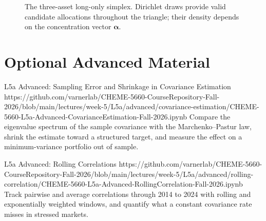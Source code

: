 \documentclass[11pt]{article}
\begin{document}
\begin{figure}[ht]
  \centering
  \caption{The three-asset long-only simplex. Dirichlet draws provide valid candidate allocations throughout the triangle; their density depends on the concentration vector $\boldsymbol\alpha$.}
  \label{fig:simplex}
\end{figure}

\newpage
\section*{Optional Advanced Material}

\notebooklink
  {L5a Advanced: Sampling Error and Shrinkage in Covariance Estimation}
  {https://github.com/varnerlab/CHEME-5660-CourseRepository-Fall-2026/blob/main/lectures/week-5/L5a/advanced/covariance-estimation/CHEME-5660-L5a-Advanced-CovarianceEstimation-Fall-2026.ipynb}
  {Compare the eigenvalue spectrum of the sample covariance with the Marchenko--Pastur law, shrink the estimate toward a structured target, and measure the effect on a minimum-variance portfolio out of sample.}

\notebooklink
  {L5a Advanced: Rolling Correlations}
  {https://github.com/varnerlab/CHEME-5660-CourseRepository-Fall-2026/blob/main/lectures/week-5/L5a/advanced/rolling-correlation/CHEME-5660-L5a-Advanced-RollingCorrelation-Fall-2026.ipynb}
  {Track pairwise and average correlations through 2014 to 2024 with rolling and exponentially weighted windows, and quantify what a constant covariance rate misses in stressed markets.}
\end{document}
